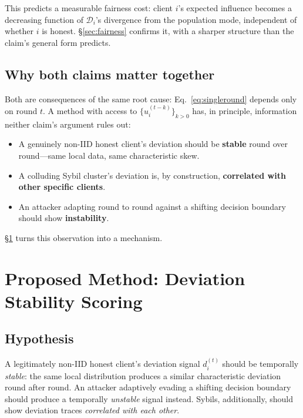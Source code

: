 \documentclass[11pt,a4paper]{article}
\begin{document}
This predicts a measurable fairness cost: client $i$'s expected influence
becomes a decreasing function of $\mathcal{D}_i$'s divergence from the
population mode, independent of whether $i$ is honest.
\S\ref{sec:fairness} confirms it, with a sharper structure than the
claim's general form predicts.

\subsection{Why both claims matter together}

Both are consequences of the same root cause: Eq.~\ref{eq:singleround}
depends only on round $t$. A method with access to
$\{u_i^{(t-k)}\}_{k>0}$ has, in principle, information neither claim's
argument rules out:

\begin{itemize}
  \item A genuinely non-IID honest client's deviation should be
    \textbf{stable} round over round---same local data, same
    characteristic skew.
  \item A colluding Sybil cluster's deviation is, by construction,
    \textbf{correlated with other specific clients}.
  \item An attacker adapting round to round against a shifting decision
    boundary should show \textbf{instability}.
\end{itemize}

\S\ref{sec:dss} turns this observation into a mechanism.

\section{Proposed Method: Deviation Stability Scoring}
\label{sec:dss}

\subsection{Hypothesis}

A legitimately non-IID honest client's deviation signal $d_i^{(t)}$
should be temporally \emph{stable}: the same local distribution produces a
similar characteristic deviation round after round. An attacker adaptively
evading a shifting decision boundary should produce a temporally
\emph{unstable} signal instead. Sybils, additionally, should show
deviation traces \emph{correlated with each other}.
\end{document}
